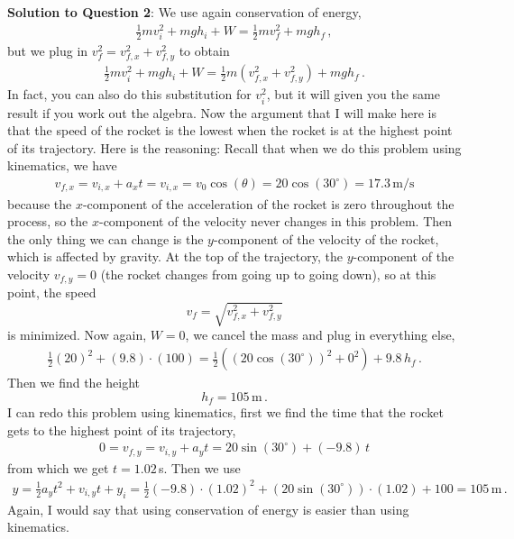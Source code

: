 \documentclass[11pt]{article}
\begin{document}
\textbf{Solution to Question 2}: We use again conservation of energy, 
\begin{align*}
\frac{1}{2}mv_i^2 + mgh_i + W = \frac{1}{2}mv_f^2 + mgh_f\,,
\end{align*}
but we plug in $v_f^2 = v_{f,x}^2 + v_{f,y}^2$ to obtain 
\begin{align*}
\frac{1}{2}mv_i^2 + mgh_i +W = \frac{1}{2}m(v_{f,x}^2 + v_{f,y}^2) + mgh_f\,.
\end{align*}
In fact, you can also do this substitution for $v_i^2$, but it will given you the same result if you work out the algebra. Now the argument that I will make here is that the speed of the rocket is the lowest when the rocket is at the highest point of its trajectory. Here is the reasoning: Recall that when we do this problem using kinematics, we have 
\begin{align*}
v_{f,x} = v_{i,x} + a_x t = v_{i,x} = v_0 \cos(\theta) =20 \cos(30^\circ) = 17.3 \,\text{m/s}
\end{align*}
because the $x$-component of the acceleration of the rocket is zero throughout the process, so the $x$-component of the velocity never changes in this problem. Then the only thing we can change is the $y$-component of the velocity of the rocket, which is affected by gravity. At the top of the trajectory, the $y$-component of the velocity $v_{f,y} = 0$ (the rocket changes from going up to going down), so at this point, the speed 
$$v_f = \sqrt{v_{f,x}^2 + v_{f,y}^2}$$ 
is minimized. Now again, $W = 0$, we cancel the mass and plug in everything else, 
\begin{align*}
\frac{1}{2}(20)^2 + (9.8)\cdot (100) = \frac{1}{2}\left((20 \cos(30^\circ))^2+ 0^2 \right) + 9.8\, h_f\,.
\end{align*}
Then we find the height 
$$h_f = 105\,\text{m}\,.$$
I can redo this problem using kinematics, first we find the time that the rocket gets to the highest point of its trajectory,
\begin{align*}
0 = v_{f,y} = v_{i,y} + a_y t =   20 \sin(30^\circ)+(-9.8)\, t
\end{align*}
from which we get $t = 1.02\,$s. Then we use 
\begin{align*}
y = \frac{1}{2}a_y t^2 + v_{i,y} t + y_i =
\frac{1}{2}(-9.8)\cdot(1.02)^2 +(20\sin(30^\circ))\cdot (1.02) +100=105\,\text{m}\,.
\end{align*}
Again, I would say that using conservation of energy is easier than using kinematics.\\
\end{document}
